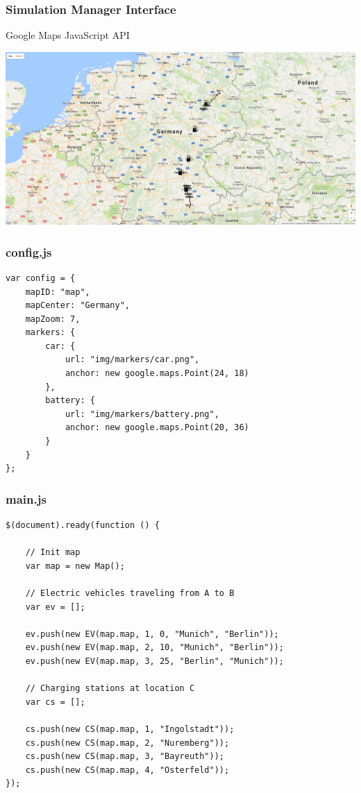 \begin{frame}
\frametitle{Simulation Manager Interface}

Google Maps JavaScript API \\

\vspace*{-3mm}
\begin{minipage}[t][0cm]{\paperwidth}%
\hspace*{-\PraesentationSeitenrand}%
\includegraphics[width=\paperwidth]{images/simulation_manager.png}
\end{minipage}

\end{frame}
\clearpage



\begin{frame}[fragile]
\frametitle{config.js}

\begin{verbatim}
var config = {
    mapID: "map",
    mapCenter: "Germany",
    mapZoom: 7,
    markers: {
        car: {
            url: "img/markers/car.png",
            anchor: new google.maps.Point(24, 18)
        },
        battery: {
            url: "img/markers/battery.png",
            anchor: new google.maps.Point(20, 36)
        }
    }
};
\end{verbatim}

\end{frame}
\clearpage



\begin{frame}[fragile]
\frametitle{main.js}

\begin{verbatim}
$(document).ready(function () {

    // Init map
    var map = new Map();

    // Electric vehicles traveling from A to B
    var ev = [];

    ev.push(new EV(map.map, 1, 0, "Munich", "Berlin"));
    ev.push(new EV(map.map, 2, 10, "Munich", "Berlin"));
    ev.push(new EV(map.map, 3, 25, "Berlin", "Munich"));

    // Charging stations at location C
    var cs = [];

    cs.push(new CS(map.map, 1, "Ingolstadt"));
    cs.push(new CS(map.map, 2, "Nuremberg"));
    cs.push(new CS(map.map, 3, "Bayreuth"));
    cs.push(new CS(map.map, 4, "Osterfeld"));
});
\end{verbatim}

\end{frame}
\clearpage



